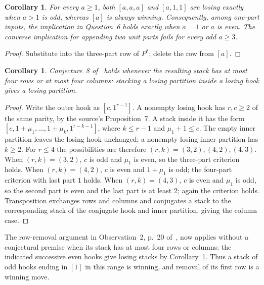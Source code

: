 \documentclass[11pt]{article}
\newtheorem{corollary}[theorem]{Corollary}
\begin{document}
\begin{corollary}\label{cor:one}
For every $a\ge1$, both $[a,a,a]$ and $[a,1,1]$ are losing exactly when
$a>1$ is odd, whereas $[a]$ is always winning.
Consequently, among one-part inputs, the implication in Question~6 holds
exactly when $a=1$ or $a$ is even. The converse implication for appending
two unit parts fails for every odd $a\ge3$.
\end{corollary}
\begin{proof}
Substitute into the three-part row of $P^*$; delete the row from $[a]$.
\end{proof}

\begin{corollary}\label{cor:stack}
Conjecture~8 of~\cite[Section~5.1, p.~19]{BGK} holds whenever the resulting
stack has at most four rows or at most four columns: stacking a losing
partition inside a losing hook gives a losing partition.
\end{corollary}
\begin{proof}
Write the outer hook as $[c,1^{r-1}]$. A nonempty losing hook has $r,c\ge2$
of the same parity, by the source's Proposition~7. A stack inside it has
the form $[c,1+\mu_1,\ldots,1+\mu_k,1^{r-k-1}]$, where
$k\le r-1$ and $\mu_1+1\le c$. The empty inner partition leaves the
losing hook unchanged; a nonempty losing inner partition has $k\ge2$.
For $r\le4$ the possibilities are therefore $(r,k)=(3,2),(4,2),(4,3)$.
When $(r,k)=(3,2)$, $c$ is odd and $\mu_1$ is even, so the three-part
criterion holds. When $(r,k)=(4,2)$, $c$ is even and $1+\mu_1$ is odd;
the four-part criterion with last part $1$ holds. When $(r,k)=(4,3)$,
$c$ is even and $\mu_1$ is odd, so the second part is even and the last
part is at least $2$; again the criterion holds. Transposition exchanges
rows and columns and conjugates a stack to the corresponding stack of
the conjugate hook and inner partition, giving the column case.
\end{proof}
The row-removal argument in Observation~2, p.~20 of~\cite{BGK}, now
applies without a conjectural premise when its stack has at most four
rows or columns: the indicated successive even hooks give losing stacks
by Corollary~\ref{cor:stack}. Thus a stack of odd hooks ending in $[1]$
in this range is winning, and removal of its first row is a winning move.
\end{document}

